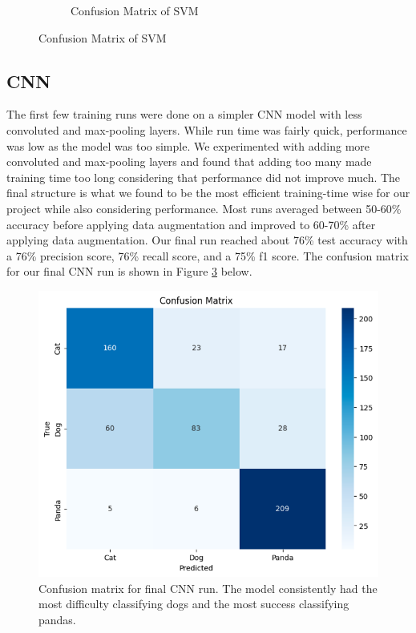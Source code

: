 \begin{figure}[h]
\begin{subfigure}{0.4\textwidth}
        \caption{Confusion Matrix of SVM}
        \label{fig:figure19}
    \end{subfigure}
\end{figure}

\subsection{CNN}
The first few training runs were done on a simpler CNN model with less convoluted and max-pooling layers. While run time was fairly quick, performance was low as the model was too simple. We experimented with adding more convoluted and max-pooling layers and found that adding too many made training time too long considering that performance did not improve much. The final structure is what we found to be the most efficient training-time wise for our project while also considering performance. Most runs averaged between 50-60\% accuracy before applying data augmentation and improved to 60-70\% after applying data augmentation. Our final run reached about 76\% test accuracy with a 76\% precision score, 76\% recall score, and a 75\% f1 score. The confusion matrix for our final CNN run is shown in Figure \ref{fig:figure4} below.

\begin{figure}[h]
	\centering
	\includegraphics[scale=0.5]{CNN_cfm}
	\caption{Confusion matrix for final CNN run. The model consistently had the most difficulty classifying dogs and the most success classifying pandas.}
	\label{fig:figure4}
\end{figure}

